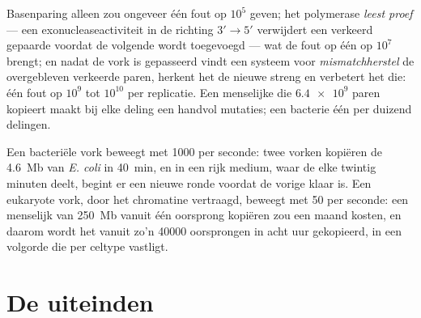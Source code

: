 \begin{proposition}[Trouw]\label{prop:b1:replication-mitosis:fidelity}
Basenparing alleen zou ongeveer één fout op $10^5$ geven; het polymerase
\emph{leest proef} --- een exonucleaseactiviteit in de richting $3' \to 5'$
verwijdert een verkeerd gepaarde  voordat de volgende wordt toegevoegd
--- wat de fout op één op $10^7$ brengt; en nadat de vork is gepasseerd vindt een
systeem voor \emph{mismatchherstel} de overgebleven verkeerde paren, herkent het de
nieuwe streng en verbetert het die: één fout op $10^9$ tot $10^{10}$  per
replicatie. Een menselijke  die $\num{6.4e9}$ paren kopieert maakt bij elke
deling een handvol mutaties; een bacterie één per duizend delingen.
\end{proposition}

\begin{example}\label{ex:b1:replication-mitosis:speed}
Een bacteriële vork beweegt met \qty{1000}{}  per seconde: twee vorken
kopiëren de \qty{4.6}{Mb} van \emph{E. coli} in \qty{40}{min}, en in een rijk
medium, waar de  elke twintig minuten deelt, begint er een nieuwe ronde voordat
de vorige klaar is. Een eukaryote vork, door het chromatine vertraagd, beweegt met
\qty{50}{} per seconde: een menselijk  van \qty{250}{Mb} vanuit één
oorsprong kopiëren zou een maand kosten, en daarom wordt het  vanuit zo'n
\num{40000} oorsprongen in acht uur gekopieerd, in een volgorde die per celtype
vastligt.
\end{example}

\section{De uiteinden}

